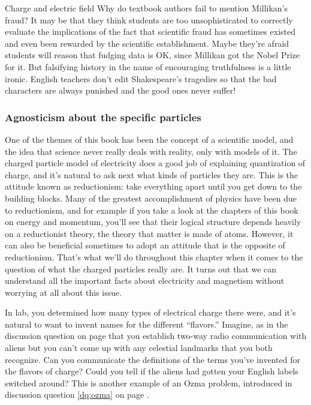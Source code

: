 \begin{envsubsection}{Charge and electric field}
	Why do textbook
	authors fail to mention Millikan's fraud? It may be that they think
	students are too unsophisticated to correctly evaluate the
	implications of the fact that scientific fraud has sometimes existed
	and even been rewarded by the scientific establishment. Maybe they're
	afraid students will reason that fudging data is OK, since Millikan
	got the Nobel Prize for it. But falsifying history in the name of
	encouraging truthfulness is a little ironic. English
	teachers don't edit Shakespeare's tragedies so that the bad characters
	are always punished and the good ones never suffer! 	

\subsubsection{Agnosticism about the specific particles}\label{reductionism}
	One of the themes of this book has been the concept of a scientific
	model, and the idea that science never really deals with reality,
	only with models of it. The charged particle model of electricity
	does a good job of explaining quantization of charge, and it's natural
	to ask next what kinds of particles they are. This is the attitude known
	as reductionism: take everything apart until you get down to the building
	blocks. Many of the greatest accomplishment of physics have been
	due to reductionism, and for example if you take a look at the chapters of this
	book on energy and momentum, you'll see that their
	logical structure depends heavily on a
	reductionist theory, the theory that matter is made of atoms. However,
	it can also be beneficial sometimes to adopt an attitude that is the
	opposite of reductionism. That's what we'll do throughout this chapter
	when it comes to the question of what the charged particles really are.
	It turns out that we can understand all the important facts about
	electricity and magnetism without worrying at all about this issue.
\end{envsubsection}

\dqheader
\begin{dq}
In lab, you determined how many types of electrical charge there were,
and it's natural to want to invent names for the different ``flavors.''
Imagine, as in the discussion question on page
\pageref{dq:ozma} that you establish two-way radio communication with aliens
but you can't
come up with any celestial landmarks that you both recognize. Can you communicate
the definitions of the terms you've invented for the flavors of charge?
Could you tell if the aliens had gotten your English labels switched around?
This is another example of an Ozma problem, introduced
in discussion question \ref{dq:ozma} on page \pageref{dq:ozma}.
\end{dq}

